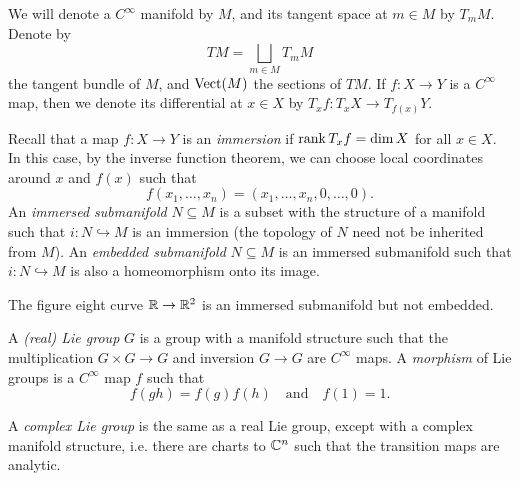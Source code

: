 \begin{remark}
  We will denote a $C^\infty$ manifold by
  $M$, and its tangent space at $m \in M$
  by $T_m M$. Denote by
  \[
    TM = \bigsqcup_{m \in M} T_m M
  \]
  the tangent bundle of $M$, and
  $\operatorname{Vect}(M)$ the sections of $TM$.
  If $f : X \to Y$ is a $C^\infty$ map,
  then we denote its differential at
  $x \in X$ by
  $T_x f : T_x X \to T_{f(x)} Y$.

  Recall that a map
  $f : X \to Y$ is an \emph{immersion}
  if $\operatorname{rank} T_x f = \dim X$ for all
  $x \in X$. In this case, by the inverse
  function
  theorem, we can choose
  local coordinates around $x$ and
  $f(x)$ such that
  \[
    f(x_1, \dots, x_n)
    = (x_1, \dots, x_n, 0, \dots, 0).
  \]
  An \emph{immersed submanifold} $N \subseteq M$
  is a subset with the structure of
  a manifold such that $i : N \hookrightarrow M$
  is an immersion (the topology of $N$
  need not be inherited from $M$). An
  \emph{embedded submanifold} $N \subseteq M$
  is an immersed submanifold such that
  $i : N \hookrightarrow M$ is also a
  homeomorphism onto its image.
\end{remark}

\begin{example}
  The figure eight curve
  $\mathbb{R} \to \mathbb{R}^2$ is an immersed submanifold
  but not embedded.
\end{example}

\begin{definition}
  A  \emph{(real) Lie group} $G$ is a
  group with a manifold structure such that
  the multiplication
  $G \times G \to G$ and
  inversion $G \to G$ are
  $C^\infty$ maps. A \emph{morphism}
  of Lie groups is a $C^\infty$ map
  $f$ such that
  \[f(gh) = f(g) f(h) \quad \text{and} \quad f(1) = 1.\]
\end{definition}

\begin{definition}
  A \emph{complex Lie group} is the
  same as a real Lie group, except
  with a complex manifold structure, i.e.
  there are charts to $\mathbb{C}^n$ such that
  the transition maps
  are analytic.
\end{definition}

